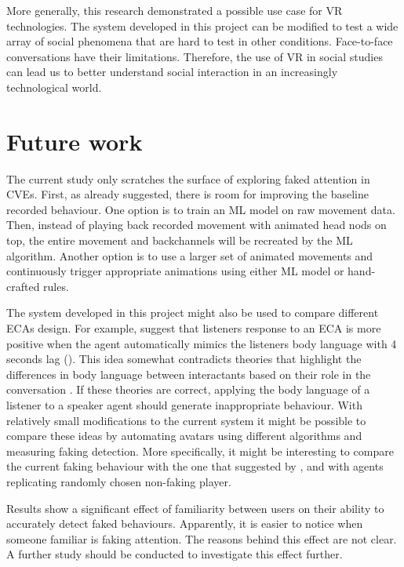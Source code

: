 \documentclass[]{simple-thesis}
\begin{document}
More generally, this research demonstrated a possible use case for VR technologies.
The system developed in this project can be modified to test a wide array of social phenomena that are hard to test in other conditions.
Face-to-face conversations have their limitations.
Therefore, the use of VR in social studies can lead us to better understand social interaction in an increasingly technological world.

\section{Future work}

The current study only scratches the surface of exploring faked attention in CVEs.
First, as already suggested, there is room for improving the baseline recorded behaviour.
One option is to train an ML model on raw movement data.
Then, instead of playing back recorded movement with animated head nods on top, the entire movement and backchannels will be recreated by the ML algorithm.
Another option is to use a larger set of animated movements and continuously trigger appropriate animations using either ML model or hand-crafted rules.

The system developed in this project might also be used to compare different ECAs design.
For example, \citeauthor{Bailenson2005} suggest that listeners response to an ECA is more positive when the agent automatically mimics the listeners body language with 4 seconds lag (\citeyear{Bailenson2005}).
This idea somewhat contradicts theories that highlight the differences in body language between interactants based on their role in the conversation \citep[see][]{Healey2013}.
If these theories are correct, applying the body language of a listener to a speaker agent should generate inappropriate behaviour.
With relatively small modifications to the current system it might be possible to compare these ideas by automating avatars using different algorithms and measuring faking detection.
More specifically, it might be interesting to compare the current faking behaviour with the one that suggested by \citeauthor{Bailenson2005}, and with agents replicating randomly chosen non-faking player.

Results show a significant effect of familiarity between users on their ability to accurately detect faked behaviours.
Apparently, it is easier to notice when someone familiar is faking attention.
The reasons behind this effect are not clear.
A further study should be conducted to investigate this effect further.
\end{document}
